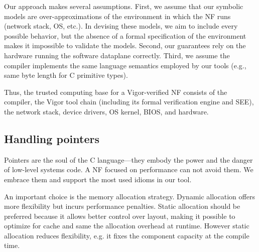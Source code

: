 \documentclass[letterpaper,twocolumn,10pt]{article}
\begin{document}
Our approach makes several assumptions. First, we assume that our symbolic
models are over-approximations of the environment in which the NF runs (network
stack, OS, etc.). In devising these models, we aim to include every possible
behavior, but the absence of a formal specification of the environment makes it
impossible to validate the models. Second, our guarantees rely on the hardware
running the software dataplane correctly. Third, we assume the compiler
implements the same language semantics employed by our tools (e.g., same byte
length for C primitive types).

Thus, the trusted computing base for a Vigor-verified NF consists of the
compiler, the Vigor tool chain (including its formal verification engine and
SEE), the network stack, device drivers, OS kernel, BIOS, and hardware.



\subsection{Handling pointers}
\label{sec:handling-pointers}

Pointers are the soul of the C language---they embody the power and the danger
of low-level systems code. A NF focused on performance can not avoid them. We
embrace them and support the most used idioms in our tool.

An important choice is the memory allocation strategy. Dynamic allocation offers
more flexibility but incurs performance penalties. Static allocation should be
preferred because it allows better control over layout, making it possible to
optimize for cache and same the allocation overhead at runtime. However static
allocation reduces flexibility, e.g. it fixes the component capacity at the
compile time.
\end{document}
